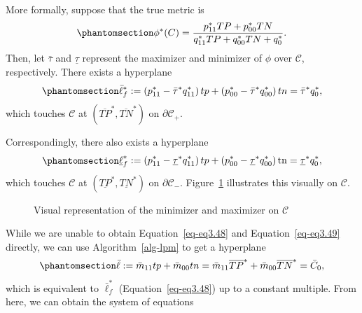 \documentclass[
  letterpaper,
  numbers=noenddot,
  DIV=11]{scrreprt}
\theoremstyle{definition}
\theoremstyle{plain}
\theoremstyle{plain}
\theoremstyle{remark}
\begin{document}
More formally, suppose that the true metric is
\begin{equation}\phantomsection\label{eq-eq3.48}{\phi^{*}(C)=\frac{p_{11}^{*} T P+p_{00}^{*} T N}{q_{11}^{*} T P+q_{00}^{*} T N+q_{0}^{*}}.}\end{equation}
Then, let \(\bar{\tau}\) and \(\underline{\tau}\) represent the
maximizer and minimizer of \(\phi\) over \(\mathcal{C}\), respectively.
There exists a hyperplane
\begin{equation}\phantomsection\label{eq-eq3.49}{\begin{aligned}
\bar{\ell}_{f}^{*}:=\left(p_{11}^{*}-\bar{\tau}^{*} q_{11}^{*}\right) t p+\left(p_{00}^{*}-\bar{\tau}^{*} q_{00}^{*}\right) t n=\bar{\tau}^{*} q_{0}^{*},
\end{aligned}}\end{equation} which touches \(\mathcal{C}\) at
\(\left(\overline{T P}^{*}, \overline{T N}^{*}\right)\) on
\(\partial \mathcal{C}_{+}\).

Correspondingly, there also exists a hyperplane
\begin{equation}\phantomsection\label{eq-eq3.50}{\begin{aligned}
\underline{\ell}_{f}^{*}:=\left(p_{11}^{*}-\underline{\tau}^{*} q_{11}^{*}\right) t p+\left(p_{00}^{*}-\underline{\tau}^{*} q_{00}^{*}\right) \operatorname{tn}=\underline{\tau}^{*} q_{0}^{*},
\end{aligned}}\end{equation} which touches \(\mathcal{C}\) at
\(\left(\underline{TP}^{*}, \underline{T N}^{*}\right)\) on
\(\partial \mathcal{C}_{-}\). Figure~\ref{fig-minmax} illustrates this
visually on \(\mathcal{C}\).

\begin{figure}


\caption{\label{fig-minmax}Visual representation of the minimizer and
maximizer on \(\mathcal{C}\)}

\end{figure}%

While we are unable to obtain Equation~\ref{eq-eq3.48} and
Equation~\ref{eq-eq3.49} directly, we can use  Algorithm~\ref{alg-lpm} 
to get a hyperplane
\begin{equation}\phantomsection\label{eq-eq3.51}{\bar{\ell}:=\bar{m}_{11} t p+\bar{m}_{00} t n= \bar{m}_{11} \overline{T P}^{*}+\bar{m}_{00} \overline{T N}^{*} = \bar{C}_{0},}\end{equation}
which is equivalent to \(\bar{\ell}_{f}^{*}\) (Equation~\ref{eq-eq3.48})
up to a constant multiple. From here, we can obtain the system of
equations
\end{document}
